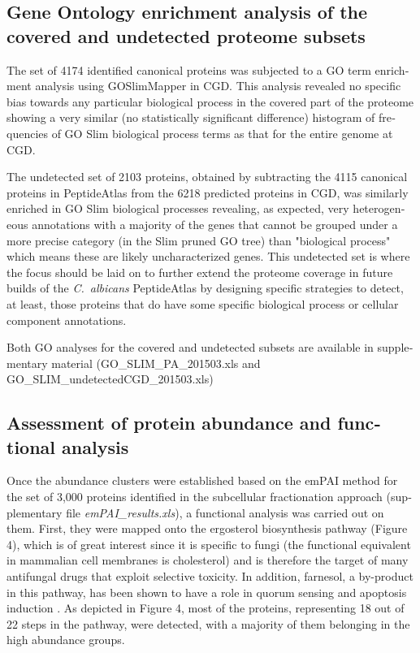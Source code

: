 \begin{otherlanguage}{british}
\subsection*{Gene Ontology enrichment analysis of the covered and undetected proteome subsets}

The set of 4174 identified canonical proteins was subjected to a GO term enrichment
analysis using GOSlimMapper in CGD. This analysis revealed no specific bias towards any
particular biological process in the covered part of the proteome showing a very similar (no
statistically significant difference) histogram of frequencies of GO Slim biological process
terms as that for the entire genome at CGD.

The undetected set of 2103 proteins, obtained by subtracting the 4115 canonical proteins in
PeptideAtlas from the 6218 predicted proteins in CGD, was similarly enriched in GO Slim
biological processes revealing, as expected, very heterogeneous annotations with a majority
of the genes that cannot be grouped under a more precise category (in the Slim pruned GO
tree) than "biological process" which means these are likely uncharacterized genes. This
undetected set is where the focus should be laid on to further extend the proteome coverage
in future builds of the \textit{\mbox{C. albicans}} PeptideAtlas by designing specific strategies to detect, at
least, those proteins that do have some specific biological process or cellular component
annotations.

Both GO analyses for the covered and undetected subsets are available in supplementary
material (GO\_SLIM\_PA\_201503.xls and GO\_SLIM\_undetectedCGD\_201503.xls)



\subsection*{Assessment of protein abundance and functional analysis}

Once the abundance clusters were established based on the emPAI method for the set of
3,000 proteins identified in the subcellular fractionation approach (supplementary file
\textit{emPAI\_results.xls}), a functional analysis was carried out on them. First, they were mapped
onto the ergosterol biosynthesis pathway (Figure 4), which is of great interest since it is
specific to fungi (the functional equivalent in mammalian cell membranes is cholesterol) and
is therefore the target of many antifungal drugs that exploit selective toxicity. In addition,
farnesol, a by-product in this pathway, has been shown to have a role in quorum sensing \citep{Albuquerque2012}
and apoptosis induction \citep{Leger2015}. As depicted in Figure 4, most of the proteins, representing 18
out of 22 steps in the pathway, were detected, with a majority of them belonging in the high
abundance groups.







\end{otherlanguage}
